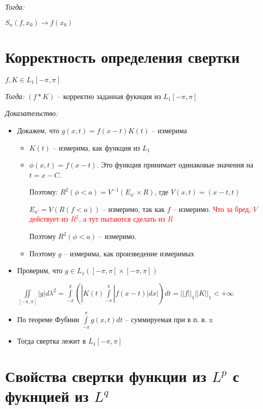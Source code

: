 \documentclass[paper=a4, fontsize=14pt]{report}
\begin{document}
\emph{Тогда:}

$ S_n(f, x_0) \to f(x_0) $

    \section{Корректность определения свертки}

    $ f, K \in L_1[-\pi, \pi] $

    \emph{Тогда:} $ (f * K)$ -- корректно заданная фукнция из $ L_1[-\pi, \pi] $
    
    
    \emph{Доказательство:}

\begin{itemize}
	\item Докажем, что $ g(x, t) = f(x - t)K(t) $ -- измерима
		\begin{itemize}
			\item $ K(t) $ -- измерима, как функция из $ L_1 $
			\item $ \phi(x, t) = f(x - t) $. Это функция принимает одинаковые значения на $ t = x - C $.

			Поэтому: $ R^2(\phi < a) = V^{-1}(E_{a'} \times R)$, где $ V(x, t) = (x - t, t) $

			$ E_{a'} = V(R(f < a)) $ -- измеримо, так как $ f $ -- измеримо.
			\textcolor{red}{Что за бред, $V$ действует из $R^2$, а тут пытаются сделать из $R$}

			Поэтому $ R^2(\phi < a) $ -- измеримо.
			\item Поэтому $ g $ -- измерима, как произведение измеримых
		\end{itemize}

	\item Проверим, что $ g \in L_1([-\pi, \pi]\times[-\pi, \pi]) $

		$ \iint\limits_{[-\pi, \pi]} | g | d\lambda^2 =
		  \int\limits_{-\pi}^{\pi} (|K(t)  \int\limits_{-\pi}^{\pi} | f(x-t)| dx |) dt =
		  ||f||_1 ||K||_1 < +\infty $
	\item По теореме Фубини $ \int\limits_{-\pi}^{\pi} g(x, t) dt $ -- суммируемая при в п. в. x

	\item Тогда свертка лежит в $ L_1[-\pi, \pi] $


\end{itemize}

    \section{Свойства свертки функции из $ L^p $ с фукнцией из $ L^q $}
\end{document}
